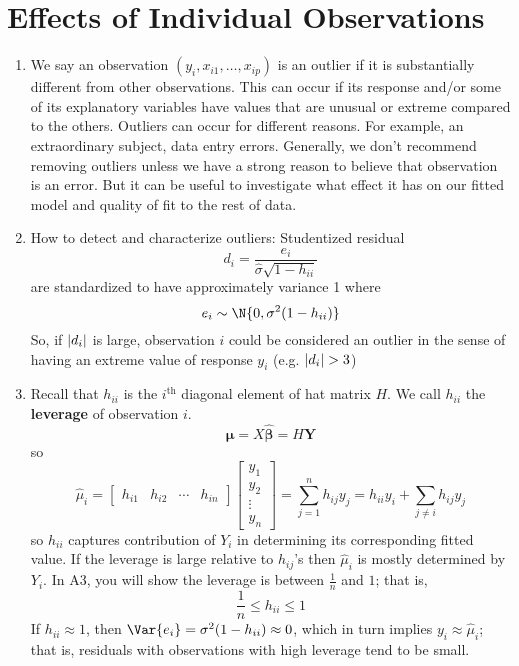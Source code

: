 \section{Effects of Individual Observations}
\begin{enumerate}[(1)]
    \item We say an observation $ (y_i,x_{i1},\ldots,x_{ip}) $
          is an outlier if it is substantially different from other
          observations. This can occur if its response
          and/or some of its explanatory variables have values that are unusual
          or extreme compared to the others. Outliers can occur
          for different reasons. For example, an extraordinary
          subject, data entry errors. Generally, we don't recommend removing
          outliers unless we have a strong reason to believe that observation
          is an error. But it can be useful to investigate what
          effect it has on our fitted model and quality of fit to
          the rest of data.
    \item How to detect and characterize outliers: Studentized residual
          \[ d_i=\frac{e_i}{\hat{\sigma}\sqrt{1-h_{ii}}}  \]
          are standardized to have approximately variance 1 where
          \[ e_i\sim\N{0,\sigma^2(1-h_{ii})} \]
          So, if $ \lvert d_i\rvert $ is large, observation $ i $ could
          be considered an outlier in the sense of having an
          extreme value of response $ y_i $ (e.g. $ \lvert d_i\rvert>3 $)
    \item Recall that $ h_{ii} $ is the $ i^{\text{th}} $ diagonal
          element of hat matrix $ H $. We call $ h_{ii} $ the \textbf{leverage}
          of observation $ i $.
          \[ \hat{\symbf{\mu}}=X\hat{\symbf{\beta}}=H\symbf{Y} \]
          so
          \[ \hat{\mu}_i=\begin{bmatrix}
                  h_{i1} & h_{i2} & \cdots & h_{i n}
              \end{bmatrix}\begin{bmatrix}
                  y_1    \\
                  y_2    \\
                  \vdots \\
                  y_n
              \end{bmatrix}=\sum_{j=1}^{n} h_{i j}y_j
              =h_{ii}y_i+\sum_{j\neq i}h_{i j}y_j  \]
          so $ h_{ii} $ captures contribution of $ Y_i $ in determining
          its corresponding fitted value. If the leverage is large
          relative to $ h_{ij} $'s then $ \hat{\mu}_i $
          is mostly determined by $ Y_i $. In A3, you will show
          the leverage is between $ \frac{1}{n} $ and $ 1 $; that is,
          \[ \frac{1}{n} \le h_{ii}\le 1 \]
          If $ h_{ii}\approx 1 $, then $ \Var{e_i}=\sigma^2(1-h_{ii})\approx 0 $,
          which in turn implies $ y_i\approx \hat{\mu}_i $; that is,
          residuals with observations with high leverage tend to be small.


\end{enumerate}
